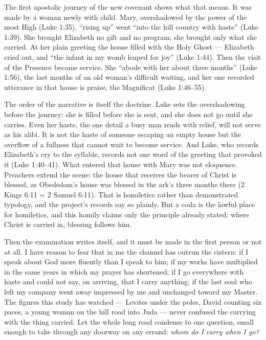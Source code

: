 The first apostolic journey of the new covenant shows what that means.
It was made by a woman newly with child. Mary, overshadowed by the
power of the most High (Luke 1:35), ``rising up'' went ``into the hill
country with haste'' (Luke 1:39). She brought Elizabeth no gift and no
program; she brought only what she carried. At her plain greeting the
house filled with the Holy Ghost --- Elizabeth cried out, and ``the
infant in my womb leaped for joy'' (Luke 1:44). Then the visit of the
Presence became service. She ``abode with her about three months''
(Luke 1:56), the last months of an old woman's difficult waiting, and
her one recorded utterance in that house is praise, the Magnificat
(Luke 1:46--55).

The order of the narrative is itself the doctrine. Luke sets the
overshadowing before the journey: she is filled before she is sent,
and she does not go until she carries. Even her haste, the one detail
a busy man reads with relief, will not serve as his alibi. It is not
the haste of someone escaping an empty house but the overflow of a
fullness that cannot wait to become service. And Luke, who records
Elizabeth's cry to the syllable, records not one word of the greeting
that provoked it (Luke 1:40--41). What entered that house with Mary
was not eloquence. Preachers extend
the scene: the house that receives the bearer of Christ is blessed, as
Obededom's house was blessed in the ark's three months there (2 Kings
6:11 = 2 Samuel 6:11). That is homiletics rather than demonstrated
typology, and the project's records say so plainly. But a coda is the
lawful place for homiletics, and this homily claims only the principle
already stated: where Christ is carried in, blessing follows him.

Then the examination writes itself, and it must be made in the first
person or not at all. I have reason to fear that in me the channel has
outrun the cistern: if I speak about God more fluently than I speak to
him; if my works have multiplied in the same years in which my prayer
has shortened; if I go everywhere with haste and could not say, on
arriving, that I carry anything; if the last soul who left my company
went away impressed by me and unchanged toward my Master. The figures
this study has watched --- Levites under the poles, David counting six
paces, a young woman on the hill road into Juda --- never confused the
carrying with the thing carried. Let the whole long road condense to
one question, small enough to take through any doorway on any errand:
\emph{whom do I carry when I go?}

